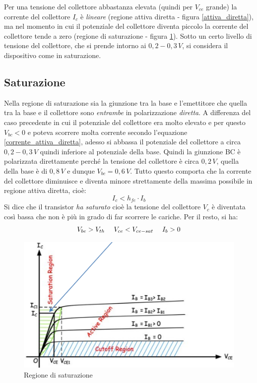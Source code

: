 \documentclass[12pt, a4paper]{report}
\begin{document}
Per una tensione del collettore abbastanza elevata (quindi per $V_{ce}$ grande) la corrente del collettore $I_{c}$ è \textit{lineare} (regione attiva diretta - figura \ref{attiva_diretta}), ma nel momento in cui il potenziale del collettore diventa piccolo la corrente del collettore tende a zero (regione di saturazione - figura \ref{saturazione}). Sotto un certo livello di tensione del collettore, che si prende intorno ai $ 0,2 - 0,3\,V$, si considera il dispositivo come in saturazione.

\subsection{Saturazione}
Nella regione di saturazione sia la giunzione tra la base e l'emettitore che quella tra la base e il collettore sono \textit{entrambe} in  polarizzazione \textit{diretta}. A differenza del caso precedente in cui il potenziale del collettore era molto elevato e per questo $V_{bc} < 0$ e poteva scorrere molta corrente secondo l'equazione \eqref{corrente_attiva_diretta}, adesso si abbassa il potenziale del collettore a circa $ 0,2 - 0,3\,V$ quindi inferiore al potenziale della base. Quindi la giunzione BC è polarizzata direttamente perché la tensione del collettore è circa $0,2\,V$, quella della base è di $0,8\,V$ e dunque $V_{bc} = 0,6\,V$. Tutto questo comporta che la corrente del collettore diminuisce e diventa minore strettamente della massima possibile in regione attiva diretta, cioè:
\begin{equation}
    I_{c} < h_{fe} \cdot I_{b}
\end{equation}
Si dice che il transistor \textit{ha saturato} cioè la tensione del collettore $V_{c}$ è diventata così bassa che non è più in grado di far scorrere le cariche. Per il resto, si ha:
\begin{equation*}
    V_{be} > V_{th} \text{ \, \, } V_{ce} < V_{ce-sat} \text{ \, \, } I_{b} > 0
\end{equation*}
\begin{figure}[h]
    \centering
    \includegraphics[scale=0.37,angle=0]{bjt_saturazione.png}
    \caption{Regione di saturazione}
    \label{saturazione}
\end{figure}
\end{document}
